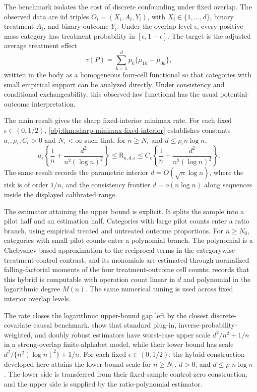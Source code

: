 The benchmark isolates the cost of discrete confounding under fixed overlap. The observed data are iid triples \(O_i=(X_i,A_i,Y_i)\), with \(X_i\in\{1,\ldots,d\}\), binary treatment \(A_i\), and binary outcome \(Y_i\). Under the overlap level \(\epsilon\), every positive-mass category has treatment probability in \([\epsilon,1-\epsilon]\). The target is the adjusted average treatment effect
\[
\tau(P)=\sum_{k=1}^d p_k\{\mu_{1k}-\mu_{0k}\},
\]
written in the body as a homogeneous four-cell functional so that categories with small empirical support can be analyzed directly. Under consistency and conditional exchangeability, this observed-law functional has the usual potential-outcome interpretation.

The main result gives the sharp fixed-interior minimax rate. For each fixed \(\epsilon\in(0,1/2)\), \cref{obj:thm:sharp-minimax-fixed-interior} establishes constants \(a_\epsilon,\rho_\epsilon,C_\epsilon>0\) and \(N_\epsilon<\infty\) such that, for \(n\ge N_\epsilon\) and \(d\le\rho_\epsilon n\log n\),
\[
a_\epsilon\left\{\frac1n+\frac{d^2}{n^2(\log n)^2}\right\}
\le
\mathsf R_{n,d,\epsilon}
\le
C_\epsilon\left\{\frac1n+\frac{d^2}{n^2(\log n)^2}\right\}.
\]
The same result records the parametric interior \(d=O(\sqrt n\log n)\), where the risk is of order \(1/n\), and the consistency frontier \(d=o(n\log n)\) along sequences inside the displayed calibrated range.

The estimator attaining the upper bound is explicit. It splits the sample into a pilot half and an estimation half. Categories with large pilot counts enter a ratio branch, using empirical treated and untreated outcome proportions. For \(n\ge N_0\), categories with small pilot counts enter a polynomial branch. The polynomial is a Chebyshev-based approximation to the reciprocal terms in the categorywise treatment-control contrast, and its monomials are estimated through normalized falling-factorial moments of the four treatment-outcome cell counts.  records that this hybrid is computable with operation count linear in \(d\) and polynomial in the logarithmic degree \(M(n)\). The same numerical tuning is used across fixed interior overlap levels.

The rate closes the logarithmic upper-bound gap left by the closest discrete-covariate causal benchmark. \citet{ZengBalakrishnanHanKennedy2024} show that standard plug-in, inverse-probability-weighted, and doubly robust estimators have worst-case upper scale \(d^2/n^2+1/n\) in a strong-overlap finite-alphabet model, while their lower bound has scale \(d^2/\{n^2(\log n)^2\}+1/n\). For each fixed \(\epsilon\in(0,1/2)\), the hybrid construction developed here attains the lower-bound scale for \(n\ge N_\epsilon\), \(d>0\), and \(d\le\rho_\epsilon n\log n\). The lower side is transferred from their fixed-sample control-zero construction, and the upper side is supplied by the ratio-polynomial estimator.

